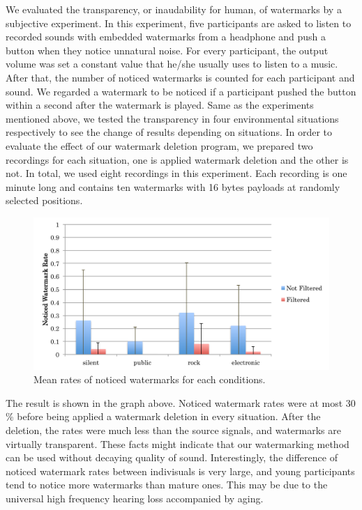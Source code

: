We evaluated the transparency, or inaudability for human, of watermarks by a subjective experiment.
In this experiment, five participants are asked to listen to recorded sounds with embedded watermarks from a headphone and push a button when they notice unnatural noise.
For every participant, the output volume was set a constant value that he/she usually uses to listen to a music.
After that, the number of noticed watermarks is counted for each participant and sound.
We regarded a watermark to be noticed if a participant pushed the button within a second after the watermark is played.
Same as the experiments mentioned above, we tested the transparency in four environmental situations respectively to see the change of results depending on situations.
In order to evaluate the effect of our watermark deletion program, we prepared two recordings for each situation, one is applied watermark deletion and the other is not.
In total, we used eight recordings in this experiment.
Each recording is one minute long and contains ten watermarks with 16 bytes payloads at randomly selected positions.

\begin{figure}[htbp]
 \begin{center}
  \includegraphics[width=120mm]{evaluation_transparency.pdf}
 \end{center}
 \caption{Mean rates of noticed watermarks for each conditions.}
 \label{fig:eval_tran}
\end{figure}

The result is shown in the graph above.
Noticed watermark rates were at most 30 \% before being applied a watermark deletion in every situation.
After the deletion, the rates were much less than the source signals, and watermarks are virtually transparent.
These facts might indicate that our watermarking method can be used without decaying quality of sound.
Interestingly, the difference of noticed watermark rates between indivisuals is very large, and young participants tend to notice more watermarks than mature ones.
This may be due to the universal high frequency hearing loss accompanied by aging.